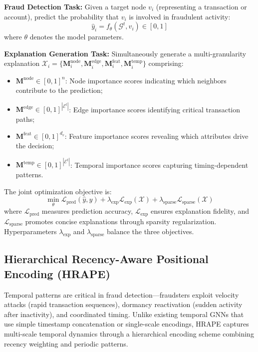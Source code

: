 \noindent\textbf{Fraud Detection Task:} Given a target node $v_i$ (representing a transaction or account), predict the probability that $v_i$ is involved in fraudulent activity:
\begin{equation}
    \hat{y}_i = f_\theta(\mathcal{G}^t, v_i) \in [0, 1]
\end{equation}
where $\theta$ denotes the model parameters.

\noindent\textbf{Explanation Generation Task:} Simultaneously generate a multi-granularity explanation $\mathcal{X}_i = \{\mathbf{M}^{\text{node}}_i, \mathbf{M}^{\text{edge}}_i, \mathbf{M}^{\text{feat}}_i, \mathbf{M}^{\text{temp}}_i\}$ comprising:

\begin{itemize}
    \item $\mathbf{M}^{\text{node}} \in [0,1]^n$: Node importance scores indicating which neighbors contribute to the prediction;
    \item $\mathbf{M}^{\text{edge}} \in [0,1]^{|\mathcal{E}^t|}$: Edge importance scores identifying critical transaction paths;
    \item $\mathbf{M}^{\text{feat}} \in [0,1]^{d_v}$: Feature importance scores revealing which attributes drive the decision;
    \item $\mathbf{M}^{\text{temp}} \in [0,1]^{|\mathcal{E}^t|}$: Temporal importance scores capturing timing-dependent patterns.
\end{itemize}

The joint optimization objective is:
\begin{equation}
    \min_\theta \mathcal{L}_{\text{pred}}(\hat{y}, y) + \lambda_{\text{exp}} \mathcal{L}_{\text{exp}}(\mathcal{X}) + \lambda_{\text{sparse}} \mathcal{L}_{\text{sparse}}(\mathcal{X})
\end{equation}
where $\mathcal{L}_{\text{pred}}$ measures prediction accuracy, $\mathcal{L}_{\text{exp}}$ ensures explanation fidelity, and $\mathcal{L}_{\text{sparse}}$ promotes concise explanations through sparsity regularization. Hyperparameters $\lambda_{\text{exp}}$ and $\lambda_{\text{sparse}}$ balance the three objectives.

\subsection{Hierarchical Recency-Aware Positional Encoding (HRAPE)}
\label{subsec:hrape}

Temporal patterns are critical in fraud detection—fraudsters exploit velocity attacks (rapid transaction sequences), dormancy reactivation (sudden activity after inactivity), and coordinated timing. Unlike existing temporal GNNs that use simple timestamp concatenation or single-scale encodings, HRAPE captures multi-scale temporal dynamics through a hierarchical encoding scheme combining recency weighting and periodic patterns.

